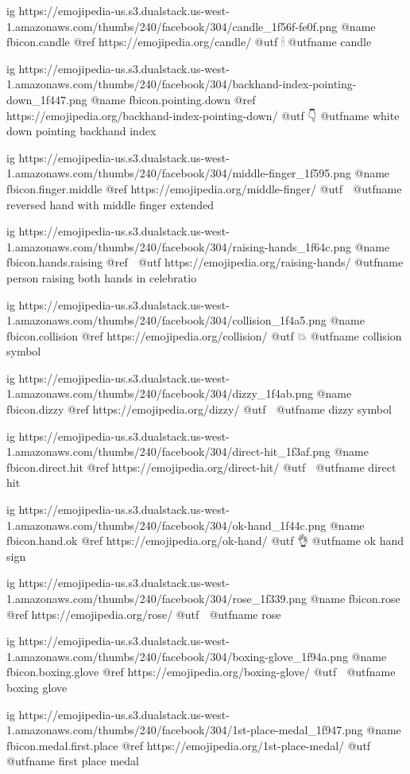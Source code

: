 	ig https://emojipedia-us.s3.dualstack.us-west-1.amazonaws.com/thumbs/240/facebook/304/candle_1f56f-fe0f.png
	@name fbicon.candle
	@ref https://emojipedia.org/candle/
	@utf 🕯
	@utfname candle

	ig https://emojipedia-us.s3.dualstack.us-west-1.amazonaws.com/thumbs/240/facebook/304/backhand-index-pointing-down_1f447.png
	@name fbicon.pointing.down
	@ref https://emojipedia.org/backhand-index-pointing-down/
	@utf 👇
	@utfname white down pointing backhand index

	ig https://emojipedia-us.s3.dualstack.us-west-1.amazonaws.com/thumbs/240/facebook/304/middle-finger_1f595.png
	@name fbicon.finger.middle
	@ref https://emojipedia.org/middle-finger/
	@utf 🖕
	@utfname reversed hand with middle finger extended

	ig https://emojipedia-us.s3.dualstack.us-west-1.amazonaws.com/thumbs/240/facebook/304/raising-hands_1f64c.png
	@name fbicon.hands.raising
	@ref 🙌
	@utf https://emojipedia.org/raising-hands/
	@utfname person raising both hands in celebratio

	ig https://emojipedia-us.s3.dualstack.us-west-1.amazonaws.com/thumbs/240/facebook/304/collision_1f4a5.png
	@name fbicon.collision
	@ref https://emojipedia.org/collision/
	@utf 💥
	@utfname collision symbol

	ig https://emojipedia-us.s3.dualstack.us-west-1.amazonaws.com/thumbs/240/facebook/304/dizzy_1f4ab.png
	@name fbicon.dizzy
	@ref https://emojipedia.org/dizzy/
	@utf 💫
	@utfname dizzy symbol

	ig https://emojipedia-us.s3.dualstack.us-west-1.amazonaws.com/thumbs/240/facebook/304/direct-hit_1f3af.png
	@name fbicon.direct.hit
	@ref https://emojipedia.org/direct-hit/
	@utf 🎯
	@utfname direct hit

	ig https://emojipedia-us.s3.dualstack.us-west-1.amazonaws.com/thumbs/240/facebook/304/ok-hand_1f44c.png
	@name fbicon.hand.ok
	@ref https://emojipedia.org/ok-hand/
	@utf 👌
	@utfname ok hand sign

	ig https://emojipedia-us.s3.dualstack.us-west-1.amazonaws.com/thumbs/240/facebook/304/rose_1f339.png
	@name fbicon.rose
	@ref https://emojipedia.org/rose/
	@utf 🌹
	@utfname rose

	ig https://emojipedia-us.s3.dualstack.us-west-1.amazonaws.com/thumbs/240/facebook/304/boxing-glove_1f94a.png
	@name fbicon.boxing.glove
	@ref https://emojipedia.org/boxing-glove/
	@utf 🥊
	@utfname boxing glove

	ig https://emojipedia-us.s3.dualstack.us-west-1.amazonaws.com/thumbs/240/facebook/304/1st-place-medal_1f947.png
	@name fbicon.medal.first.place
	@ref https://emojipedia.org/1st-place-medal/
	@utf 🥇
	@utfname first place medal

